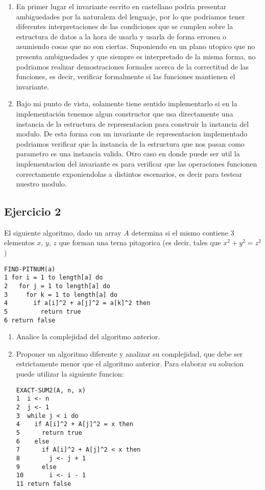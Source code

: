 \documentclass[10pt, a4paper]{article}
\begin{document}
\begin{enumerate}
 \item En primer lugar el invariante escrito en castellano podria presentar ambiguedades por la naturaleza del lenguaje, por lo que podriamos tener diferentes interpretaciones de las condiciones que se cumplen sobre la estructura de datos a la hora de usarla y usarla de forma erronea o asumiendo cosas que no son ciertas. Suponiendo en un plano utopico que no presenta ambiguedades y que siempre es interpretado de la misma forma, no podriamos realizar demostraciones formales acerca de la correctitud de las funciones, es decir, verificar formalmente si las funciones mantienen el invariante.
 
 \item Bajo mi punto de vista, solamente tiene sentido implementarlo si en la implementaci\'on tenemos algun constructor que usa directamente una instancia de la estructura de representacion para construir la instancia del modulo. De esta forma con un invariante de representacion implementado podriamos verificar que la instancia de la estructura que nos pasan como parametro es una instancia valida. Otro caso en donde puede ser util la implementacion del invariante es para verificar que las operaciones funcionen correctamente exponiendolas a distintos escenarios, es decir para testear nuestro modulo.
\end{enumerate}



\subsection*{Ejercicio 2}
El siguiente algoritmo, dado un array $A$ determina si el mismo contiene $3$ elementos $x$, $y$, $z$ que forman una terna pitagorica (es decir, tales que $x^2 + y^2 = z^2$)

\begin{verbatim}
FIND-PITNUM(a)
1 for i = 1 to length[a] do
2   for j = 1 to length[a] do
3     for k = 1 to length[a] do
4       if a[i]^2 + a[j]^2 = a[k]^2 then
5         return true
6 return false
\end{verbatim}

\begin{enumerate}
 \item Analice la complejidad del algoritmo anterior.
 \item Proponer un algoritmo diferente y analizar su complejidad, que debe ser estrictamente menor que el algoritmo anterior. Para elaborar su solucion puede utilizar la siguiente funcion:

 \begin{verbatim}
EXACT-SUM2(A, n, x)
1  i <- n
2  j <- 1
3  while j < i do
4    if A[i]^2 + A[j]^2 = x then
5      return true
6    else
7      if A[i]^2 + A[j]^2 < x then
8        j <- j + 1
9      else
10       i <- i - 1
11 return false
\end{verbatim}

\end{enumerate}
\end{document}
